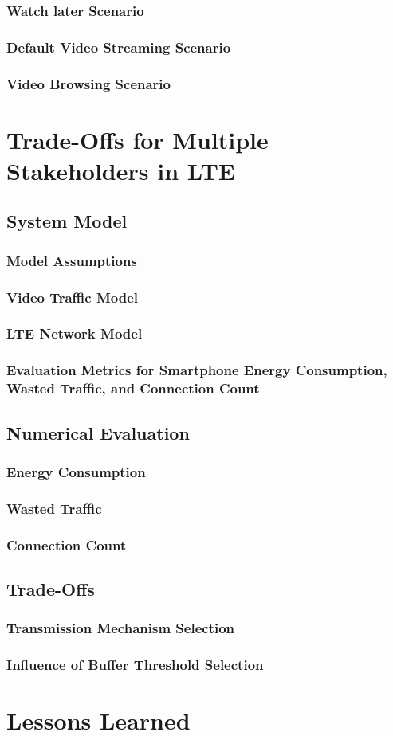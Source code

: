 \subsubsection*{Watch later Scenario}
\subsubsection*{Default Video Streaming Scenario}
\subsubsection*{Video Browsing Scenario}

\section{Trade-Offs for Multiple Stakeholders in LTE}
\cite{Schwartz2013b}

\subsection{System Model}
\subsubsection*{Model Assumptions}
\subsubsection*{Video Traffic Model}
\subsubsection*{LTE Network Model}
\subsubsection*{Evaluation Metrics for Smartphone Energy Consumption, Wasted Traffic, and Connection Count}

\subsection{Numerical Evaluation}
\subsubsection*{Energy Consumption}
\subsubsection*{Wasted Traffic}
\subsubsection*{Connection Count}

\subsection{Trade-Offs}
\subsubsection*{Transmission Mechanism Selection}
\subsubsection*{Influence of Buffer Threshold Selection}

\section{Lessons Learned}

